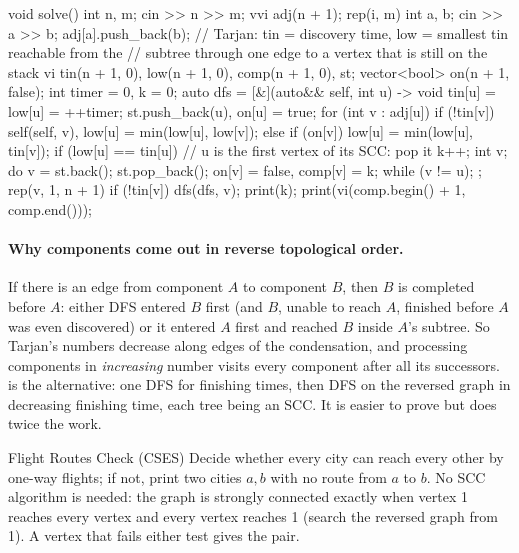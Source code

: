 \begin{code}
void solve() {
    int n, m;
    cin >> n >> m;
    vvi adj(n + 1);
    rep(i, m) {
        int a, b;
        cin >> a >> b;
        adj[a].push_back(b);
    }
    // Tarjan: tin = discovery time, low = smallest tin reachable from the
    // subtree through one edge to a vertex that is still on the stack
    vi tin(n + 1, 0), low(n + 1, 0), comp(n + 1, 0), st;
    vector<bool> on(n + 1, false);
    int timer = 0, k = 0;
    auto dfs = [&](auto&& self, int u) -> void {
        tin[u] = low[u] = ++timer;
        st.push_back(u), on[u] = true;
        for (int v : adj[u]) {
            if (!tin[v]) self(self, v), low[u] = min(low[u], low[v]);
            else if (on[v]) low[u] = min(low[u], tin[v]);
        }
        if (low[u] == tin[u]) {  // u is the first vertex of its SCC: pop it
            k++;
            int v;
            do {
                v = st.back();
                st.pop_back();
                on[v] = false, comp[v] = k;
            } while (v != u);
        }
    };
    rep(v, 1, n + 1) if (!tin[v]) dfs(dfs, v);
    print(k);
    print(vi(comp.begin() + 1, comp.end()));
}
\end{code}


\paragraph{Why components come out in reverse topological order.} If there is an edge from component $A$ to component $B$, then
$B$ is completed before $A$: either DFS entered $B$ first (and $B$, unable to reach $A$, finished before $A$ was even discovered)
or it entered $A$ first and reached $B$ inside $A$'s subtree. So Tarjan's numbers decrease along edges of the condensation, and
processing components in \emph{increasing} number visits every component after all its successors. 
is the alternative: one DFS for finishing times, then DFS on the reversed graph in decreasing finishing time, each tree being an
SCC. It is easier to prove but does twice the work.

\begin{problem}{Flight Routes Check (CSES)}
Decide whether every city can reach every other by one-way flights; if not, print two cities $a, b$ with no route from $a$ to
$b$.
\solution No SCC algorithm is needed: the graph is strongly connected exactly when vertex 1 reaches every vertex and every vertex
reaches 1 (search the reversed graph from 1). A vertex that fails either test gives the pair.
\end{problem}

